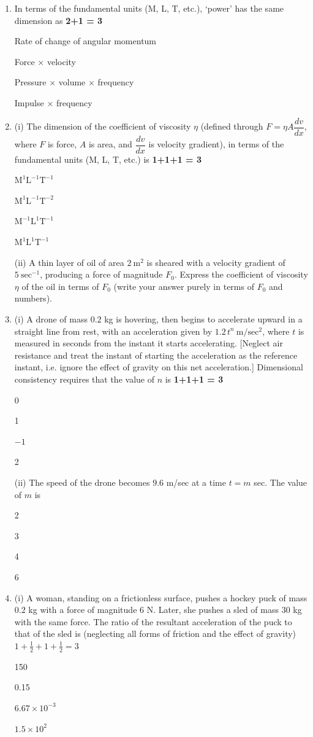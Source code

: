 \documentclass[11pt]{article}
\newcommand{\opt}[2]{%
  \begin{minipage}[t]{0.9\linewidth}
    \fbox{\textbf{#1}}\hspace{0.5em}#2
  \end{minipage}\par\vspace{2pt}
}
\begin{document}
\begin{enumerate}[leftmargin=1.6em, label=\arabic*., itemsep=14pt]

\item In terms of the fundamental units (M, L, T, etc.), `power' has the same dimension as \hfill \textbf{2+1 = 3}
\opt{a}{Rate of change of angular momentum}
\opt{b}{Force $\times$ velocity}
\opt{c}{Pressure $\times$ volume $\times$ frequency}
\opt{d}{Impulse $\times$ frequency}

\item (i) The dimension of the coefficient of viscosity $\eta$ (defined through $F = \eta A \dfrac{dv}{dx}$, where $F$ is force, $A$ is area, and $\dfrac{dv}{dx}$ is velocity gradient), in terms of the fundamental units (M, L, T, etc.) is \hfill \textbf{1+1+1 = 3}
\opt{a}{$\mathrm{M^1L^{-1}T^{-1}}$}
\opt{b}{$\mathrm{M^1L^{-1}T^{-2}}$}
\opt{c}{$\mathrm{M^{-1}L^1T^{-1}}$}
\opt{d}{$\mathrm{M^1L^{1}T^{-1}}$}

\vspace{4pt}
\noindent (ii) A thin layer of oil of area $2\ \mathrm{m^2}$ is sheared with a velocity gradient of $5\ \mathrm{sec^{-1}}$, producing a force of magnitude $F_0$. Express the coefficient of viscosity $\eta$ of the oil in terms of $F_0$ (write your answer purely in terms of $F_0$ and numbers).

\item (i) A drone of mass $0.2$ kg is hovering, then begins to accelerate upward in a straight line from rest, with an acceleration given by $1.2\,t^{n}\ \mathrm{m/sec^2}$, where $t$ is measured in seconds from the instant it starts accelerating. [Neglect air resistance and treat the instant of starting the acceleration as the reference instant, i.e. ignore the effect of gravity on this net acceleration.] Dimensional consistency requires that the value of $n$ is \hfill \textbf{1+1+1 = 3}
\opt{a}{0}
\opt{b}{1}
\opt{c}{$-1$}
\opt{d}{2}

\vspace{4pt}
\noindent (ii) The speed of the drone becomes $9.6$ m/sec at a time $t = m$ sec. The value of $m$ is
\opt{a}{2}
\opt{b}{3}
\opt{c}{4}
\opt{d}{6}

\item (i) A woman, standing on a frictionless surface, pushes a hockey puck of mass $0.2$ kg with a force of magnitude $6$ N. Later, she pushes a sled of mass $30$ kg with the same force. The ratio of the resultant acceleration of the puck to that of the sled is (neglecting all forms of friction and the effect of gravity) \hfill $1+\tfrac{1}{2}+1+\tfrac{1}{2} = 3$
\opt{a}{150}
\opt{b}{0.15}
\opt{c}{$6.67 \times 10^{-3}$}
\opt{d}{$1.5\times 10^2$}


\end{enumerate}
\end{document}
